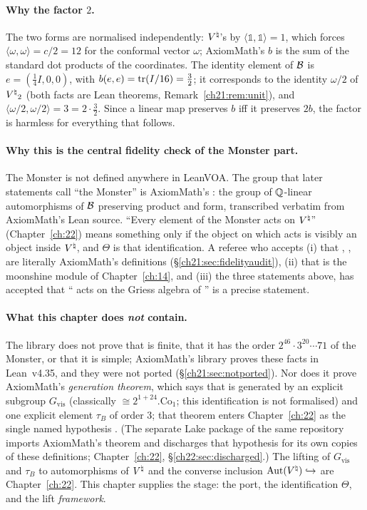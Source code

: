 \paragraph{Why the factor $2$.}  The two forms are normalised independently: ${V^{\natural}}$'s by
$\langle\mathbb1,\mathbb1\rangle=1$, which forces $\langle\omega,\omega\rangle=c/2=12$ for the conformal
vector $\omega$; AxiomMath's $b$ is the sum of the standard dot products of the coordinates.  The
identity element of $\mathcal{B}$ is $e=(\tfrac14I,0,0)$, with $b(e,e)=\operatorname{tr}(I/16)=\tfrac32$; it corresponds to
the identity $\omega/2$ of ${V^{\natural}}_2$ (both facts are Lean theorems, Remark~\ref{ch21:rem:unit}), and
$\langle\omega/2,\omega/2\rangle=3=2\cdot\tfrac32$.  Since a linear map preserves $b$ iff it preserves $2b$,
the factor is harmless for everything that follows.

\paragraph{Why this is the central fidelity check of the Monster part.}  The Monster is not defined
anywhere in LeanVOA.  The group that later statements call ``the Monster'' is AxiomMath's :
the group of ${\mathbb{Q}}$-linear automorphisms of $\mathcal{B}$ preserving product and form, transcribed verbatim
from AxiomMath's Lean source.  ``Every element of the Monster acts on ${V^{\natural}}$'' (Chapter~\ref{ch:22})
means something only if the object on which  acts is visibly an object inside ${V^{\natural}}$, and
$\Theta$ is that identification.  A referee who accepts (i) that , ,
 are literally AxiomMath's definitions (\S\ref{ch21:sec:fidelityaudit}), (ii) that
 is the moonshine module of Chapter~\ref{ch:14}, and (iii) the three statements above, has
accepted that `` acts on the Griess algebra of '' is a precise statement.

\paragraph{What this chapter does \emph{not} contain.}  The library does not prove that 
is finite, that it has the order $2^{46}\cdot3^{20}\cdots71$ of the Monster, or that it is simple;
AxiomMath's library proves these facts in Lean~v4.35, and they were not ported
(\S\ref{ch21:sec:notported}).  Nor does it prove AxiomMath's \emph{generation theorem}, which says that
 is generated by an explicit subgroup $G_{\mathrm{vis}}$ (classically
$\cong2^{1+24}.\mathrm{Co}_1$; this identification is not formalised) and one explicit element $\tau_B$
of order $3$; that theorem enters Chapter~\ref{ch:22} as the single named hypothesis .  (The separate
Lake package  of the same repository imports AxiomMath's theorem and discharges that hypothesis for
its own copies of these definitions; Chapter~\ref{ch:22}, \S\ref{ch22:sec:discharged}.)
The lifting of $G_{\mathrm{vis}}$ and $\tau_B$ to automorphisms of ${V^{\natural}}$ and the converse inclusion
$\operatorname{Aut}({V^{\natural}})\hookrightarrow$  are Chapter~\ref{ch:22}.  This chapter supplies the stage: the
port, the identification $\Theta$, and the lift \emph{framework}.


